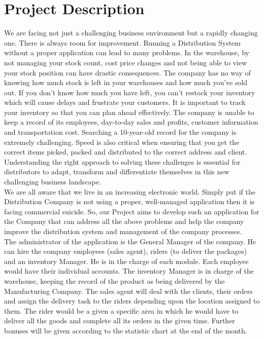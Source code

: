 \documentclass[12pt]{article}
\begin{document}
\section{Project Description}
We are facing not just a challenging business environment but a rapidly changing one. There is always room for improvement. Running a Distribution System without a proper application can lead to many problems. In the warehouse, by not managing your stock count, cost price changes and not being able to view your stock position can have drastic consequences. The company has no way of knowing how much stock is left in your warehouses and how much you’ve sold out. If you don’t know how much you have left, you can’t restock your inventory which will cause delays and frustrate your customers. It is important to track your inventory so that you can plan ahead effectively. The company is unable to keep a record of its employees, day-to-day sales and profits, customer information and transportation cost. Searching a 10-year-old record for the company is extremely challenging. Speed is also critical when ensuring that you get the correct items picked, packed and distributed to the correct address and client. Understanding the right approach to solving these challenges is essential for distributors to adapt, transform and differentiate themselves in this new challenging business landscape.  \\
We are all aware that we live in an increasing electronic world. Simply put if the Distribution Company is not using a proper, well-managed application then it is facing commercial suicide. So, our Project aims to develop such an application for the Company that can address all the above problems and help the company improve the distribution system and management of the company processes. \\
The administrator of the application is the General Manager of the company. He can hire the company employees (sales agent), riders (to deliver the packages) and an inventory Manager. He is in the charge of each module. Each employee would have their individual accounts. The inventory Manager is in charge of the warehouse, keeping the record of the product as being delivered by the Manufacturing Company. The sales agent will deal with the clients, their orders and assign the delivery task to the riders depending upon the location assigned to them. The rider would be a given a specific area in which he would have to deliver all the goods and complete all its orders in the given time. Further bonuses will be given according to the statistic chart at the end of the month. \\
\end{document}
